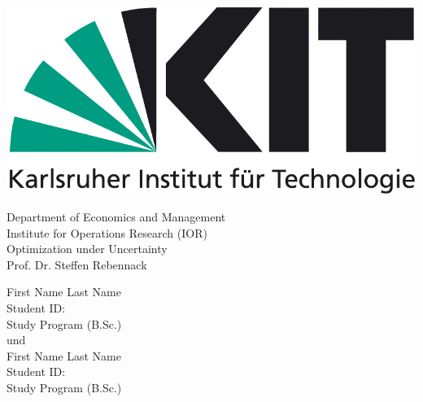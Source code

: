 \documentclass[a4paper,12pt]{article}
\begin{document}
\begin{titlepage}
    \begin{center}
        \vspace*{-80pt}
        \includegraphics[scale=0.25]{img/kit_logo.png}

        \vspace*{40pt}

        Department of Economics and Management \\[1ex]
        Institute for Operations Research (IOR) \\[1ex]
        Optimization under Uncertainty \\[1ex]
        Prof. Dr. Steffen Rebennack          

        \vspace*{25pt}   

        \vspace*{35pt}

        \fboxsep 40pt
        \fboxrule 6pt

        \vspace*{40pt}

        \normalsize

        First Name Last Name\\
        Student ID:\\
        Study Program (B.Sc.)\\[4ex]

        und \\[4ex]

        First Name Last Name\\
        Student ID:\\
        Study Program (B.Sc.)\\[4ex]
    \end{center}
\end{titlepage}
\end{document}

